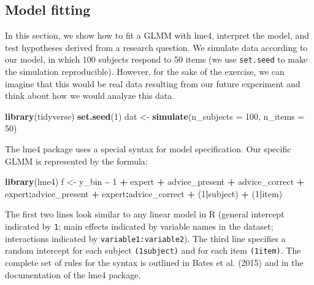 \documentclass[
  man,floatsintext]{apa6}
\newenvironment{Shaded}{\begin{snugshade}}{\end{snugshade}}
\newcommand{\AttributeTok}[1]{\textcolor[rgb]{0.13,0.29,0.53}{#1}}
\newcommand{\DecValTok}[1]{\textcolor[rgb]{0.00,0.00,0.81}{#1}}
\newcommand{\FunctionTok}[1]{\textcolor[rgb]{0.13,0.29,0.53}{\textbf{#1}}}
\newcommand{\NormalTok}[1]{#1}
\newcommand{\OtherTok}[1]{\textcolor[rgb]{0.56,0.35,0.01}{#1}}
\newcommand{\SpecialCharTok}[1]{\textcolor[rgb]{0.81,0.36,0.00}{\textbf{#1}}}
\begin{document}
\hypertarget{model-fitting}{%
\subsection{Model fitting}\label{model-fitting}}

In this section, we show how to fit a GLMM with lme4, interpret the model, and test hypotheses derived from a research question.
We simulate data according to our model, in which 100 subjects respond to 50 items (we use \texttt{set.seed} to make the simulation reproducible). However, for the sake of the exercise, we can imagine that this would be real data resulting from our future experiment and think about how we would analyze this data.

\begin{Shaded}
\begin{Highlighting}[]
\FunctionTok{library}\NormalTok{(tidyverse)}
\FunctionTok{set.seed}\NormalTok{(}\DecValTok{1}\NormalTok{)}
\NormalTok{dat }\OtherTok{\textless{}{-}} \FunctionTok{simulate}\NormalTok{(}\AttributeTok{n\_subjects =} \DecValTok{100}\NormalTok{, }\AttributeTok{n\_items =} \DecValTok{50}\NormalTok{)}
\end{Highlighting}
\end{Shaded}

The lme4 package uses a special syntax for model specification. Our specific GLMM is represented by the formula:

\begin{Shaded}
\begin{Highlighting}[]
\FunctionTok{library}\NormalTok{(lme4)}
\NormalTok{f }\OtherTok{\textless{}{-}}\NormalTok{ y\_bin }\SpecialCharTok{\textasciitilde{}} \DecValTok{1} \SpecialCharTok{+}\NormalTok{ expert }\SpecialCharTok{+}\NormalTok{ advice\_present }\SpecialCharTok{+}\NormalTok{ advice\_correct }\SpecialCharTok{+} 
\NormalTok{  expert}\SpecialCharTok{:}\NormalTok{advice\_present }\SpecialCharTok{+}\NormalTok{ expert}\SpecialCharTok{:}\NormalTok{advice\_correct }\SpecialCharTok{+}
\NormalTok{  (}\DecValTok{1}\SpecialCharTok{|}\NormalTok{subject) }\SpecialCharTok{+}\NormalTok{ (}\DecValTok{1}\SpecialCharTok{|}\NormalTok{item)}
\end{Highlighting}
\end{Shaded}

The first two lines look similar to any linear model in R (general intercept indicated by \texttt{1}; main effects indicated by variable names in the dataset; interactions indicated by \texttt{variable1:variable2}). The third line specifies a random intercept for each subject \texttt{(1\textbar{}subject)} and for each item \texttt{(1\textbar{}item)}. The complete set of rules for the syntax is outlined in Bates et al. (2015) and in the documentation of the lme4 package.
\end{document}
